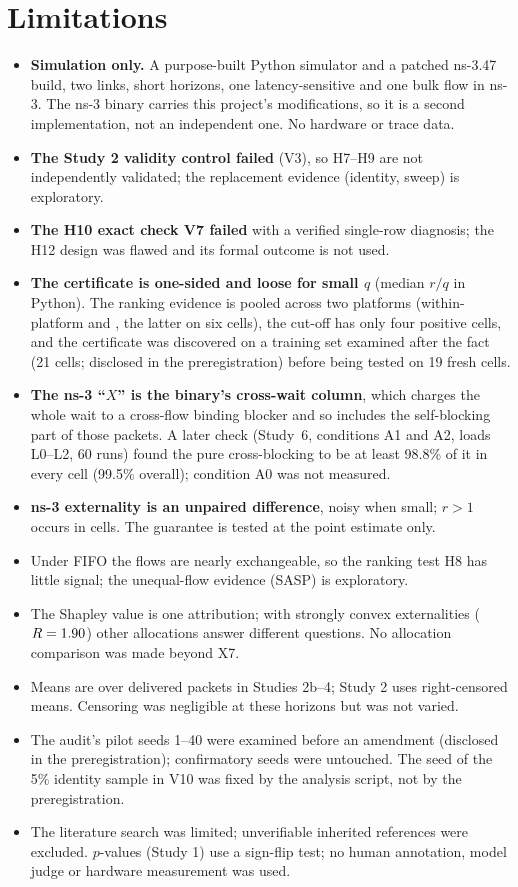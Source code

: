 \documentclass[11pt]{article}
\begin{document}
\section{Limitations}
\begin{itemize}
  \item \textbf{Simulation only.} A purpose-built Python simulator and a patched ns-3.47 build, two links, short horizons, one latency-sensitive and one bulk flow in ns-3. The ns-3 binary carries this project's modifications, so it is a second implementation, not an independent one. No hardware or trace data.
  \item \textbf{The Study 2 validity control failed} (V3), so H7--H9 are not independently validated; the replacement evidence (identity, sweep) is exploratory.
  \item \textbf{The H10 exact check V7 failed} with a verified single-row diagnosis; the H12 design was flawed and its formal outcome is not used.
  \item \textbf{The certificate is one-sided and loose for small $q$} (median $r/q$ \FourRatioMedPy{} in Python). The ranking evidence is pooled across two platforms (within-platform \FourRhoPy{} and \FourRhoNs{}, the latter on six cells), the cut-off has only four positive cells, and the certificate was discovered on a training set examined after the fact (21 cells; disclosed in the preregistration) before being tested on 19 fresh cells.
  \item \textbf{The ns-3 ``$X$'' is the binary's cross-wait column}, which charges the whole wait to a cross-flow binding blocker and so includes the self-blocking part of those packets. A later check (Study~6, conditions A1 and A2, loads L0--L2, 60 runs) found the pure cross-blocking to be at least 98.8\% of it in every cell (99.5\% overall); condition A0 was not measured.
  \item \textbf{ns-3 externality is an unpaired difference}, noisy when small; $r>1$ occurs in \FourNsRAboveOne{} cells. The guarantee is tested at the point estimate only.
  \item Under FIFO the flows are nearly exchangeable, so the ranking test H8 has little signal; the unequal-flow evidence (SASP) is exploratory.
  \item The Shapley value is one attribution; with strongly convex externalities ($R=1.90$) other allocations answer different questions. No allocation comparison was made beyond X7.
  \item Means are over delivered packets in Studies 2b--4; Study 2 uses right-censored means. Censoring was negligible at these horizons but was not varied.
  \item The audit's pilot seeds 1--40 were examined before an amendment (disclosed in the preregistration); confirmatory seeds were untouched. The seed of the 5\% identity sample in V10 was fixed by the analysis script, not by the preregistration.
  \item The literature search was limited; unverifiable inherited references were excluded. $p$-values (Study 1) use a sign-flip test; no human annotation, model judge or hardware measurement was used.
\end{itemize}
\end{document}
